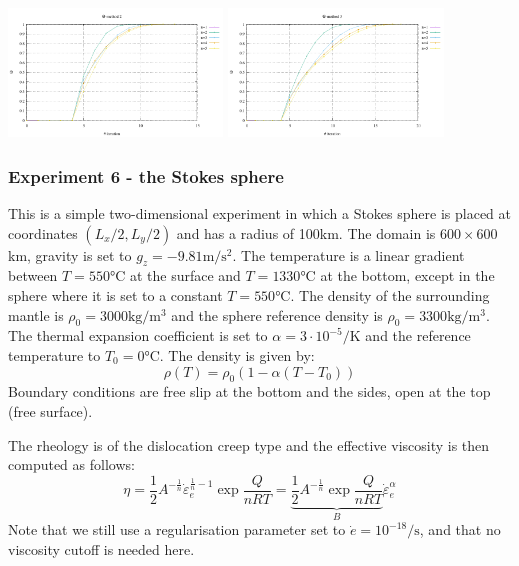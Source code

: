 \begin{center}
\includegraphics[width=5.7cm]{python_codes/fieldstone_87/results/experiment_05/theta_meth2}
\includegraphics[width=5.7cm]{python_codes/fieldstone_87/results/experiment_05/theta_meth3}
\end{center}



\newpage
\subsubsection*{Experiment 6 - the Stokes sphere}

This is a simple two-dimensional experiment in which a Stokes sphere is placed at coordinates 
$(L_x/2,L_y/2)$ and has a radius of 100\si{\kilo\metre}. 
The domain is $600\times600$\si{\kilo\metre}, 
gravity is set to $g_z=-9.81\si{\metre\per\square\second}$.
The temperature is a linear gradient between  $T=550\si{\celsius}$ 
at the surface and $T=1330\si{\celsius}$ at the bottom,
except in the sphere where it is set to a constant $T=550\si{\celsius}$.
The density of the surrounding mantle is $\rho_0=3000\si{\kilogram\per\cubic\meter}$ 
and the sphere reference density is $\rho_0=3300\si{\kilogram\per\cubic\meter}$. The thermal expansion 
coefficient is set to $\alpha=3\cdot 10^{-5} \si{\per\kelvin}$ and the reference temperature to $T_0=0\si{\celsius}$.
The density is given by: 
\[
\rho(T)=\rho_0(1-\alpha(T-T_0))
\]
Boundary conditions are free slip at the bottom and the sides, open at the top (free surface).

The rheology is of the dislocation creep type and the effective viscosity is then computed as follows:
\[
\eta 
= \frac{1}{2} A^{-\frac1n} \dot\varepsilon_e^{\frac1n-1}  \exp \frac{Q}{nRT} 
= \underbrace{ \frac{1}{2} A^{-\frac1n} \exp \frac{Q}{nRT} }_{B} \dot\varepsilon_e^{\alpha}  
\]
Note that we still use a regularisation parameter set to $\dot{e}=10^{-18}\si{\per\second}$, 
and that no viscosity cutoff is needed here. 


